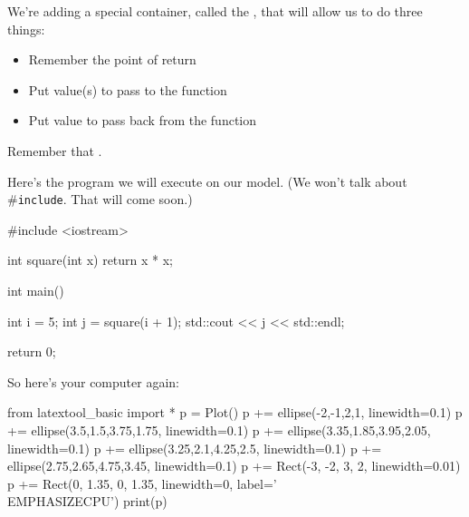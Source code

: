 We're adding a special container, called the , that will allow us to do three things:

\begin{itemize}
\item Remember the point of return
\item Put value(s) to pass to the function
\item Put value to pass back from the function
\end{itemize}

Remember that .

Here's the program we will execute on our model. (We won't talk about \#\verb!include!. That will come soon.)

\begin{consolethree}[escapeinside=||]
#include <iostream>

int square(int x)
{
    return x * x;
}

int main()
{
    int i = 5;
    int j = square(i + 1);
    std::cout << j << std::endl;

    return 0;
}
\end{consolethree}
So here's your computer again:
\begin{python}
from latextool_basic import *
p = Plot()
p += ellipse(-2,-1,2,1, linewidth=0.1)
p += ellipse(3.5,1.5,3.75,1.75, linewidth=0.1)
p += ellipse(3.35,1.85,3.95,2.05, linewidth=0.1)
p += ellipse(3.25,2.1,4.25,2.5, linewidth=0.1)
p += ellipse(2.75,2.65,4.75,3.45, linewidth=0.1)
p += Rect(-3, -2, 3, 2, linewidth=0.01)
p += Rect(0, 1.35, 0, 1.35, linewidth=0, label='\\EMPHASIZE{CPU}')
print(p)
\end{python}

\newpage

